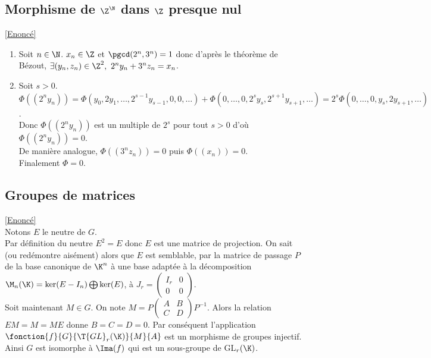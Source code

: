 \documentclass[8pt]{book}
\begin{document}
	\subsection{Morphisme de $\Z^\N$ dans $\Z$ presque nul }
	\label{Morphisme de Z^N dans Z presque nul corrigé}
	\textcolor{blue}{\hyperref[Morphisme de Z^N dans Z presque nul]{[Enoncé]}}\\
	\begin{enumerate}[leftmargin=*]
		\item Soit $n\in \N$. $x_n\in \Z$ et $\pgcd(2^n,3^n)=1$ donc d'après le théorème de Bézout, $\exists (y_n,z_n)\in \Z^2,\ 2^ny_n+3^nz_n=x_n$.\\
		\item Soit $s>0$.\\
		$\Phi((2^ny_n))=\Phi(y_0,2y_1,\dots,2^{s-1}y_{s-1},0,0,\dots)+\Phi(0,\dots,0,2^sy_s,2^{s+1}y_{s+1},\dots)=2^s\Phi(0,\dots,0,y_s,2y_{s+1},\dots)$.\\
		Donc $\Phi((2^ny_n))$ est un multiple de $2^s$ pour tout $s>0$ d'où $\Phi((2^ny_n))=0$.\\
		De manière analogue, $\Phi((3^nz_n))=0$ puis $\Phi((x_n))=0$.\\
		Finalement $\Phi=0$.
	\end{enumerate}
	
	\subsection{Groupes de matrices }
	\label{Groupes de matrices corrigé}
	\textcolor{blue}{\hyperref[Groupes de matrices]{[Enoncé]}}\\
	Notons $E$ le neutre de $G$.\\
	Par définition du neutre $E^2=E$ donc $E$ est une matrice de projection. On sait (ou redémontre aisément) alors que $E$ est semblable, par la matrice de passage $P$ de la base canonique de $\K^n$ à une base adaptée à la décomposition $\M_n(\K)=\ker(E-I_n)\bigoplus\ker(E)$, à $J_r=\left(\begin{array}{c|c}
		I_r&0\\
		\hline
		0&0
	\end{array}\right)$.\\
	Soit maintenant $M\in G$. On note $M=P\begin{pmatrix}
		A&B\\
		C&D
	\end{pmatrix}P^{-1}$. Alors la relation $EM=M=ME$ donne $B=C=D=0$. Par conséquent l'application $\fonction{f}{G}{\T{GL}_r(\K)}{M}{A}$ est un morphisme de groupes injectif.\\
	Ainsi $G$ est isomorphe à $\Ima(f)$ qui est un sous-groupe de GL$_r(\K)$.
	
\end{document}
